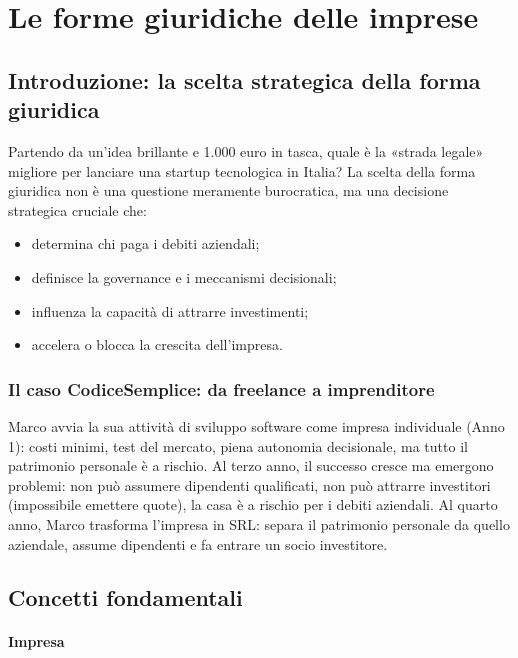 \documentclass[a4paper,12pt]{article}
\begin{document}
	\section{Le forme giuridiche delle imprese}
	
	\subsection{Introduzione: la scelta strategica della forma giuridica}
	
	Partendo da un'idea brillante e 1.000 euro in tasca, quale è la «strada legale» migliore per lanciare una startup tecnologica in Italia?%
	La scelta della forma giuridica non è una questione meramente burocratica, ma una decisione strategica cruciale che:
	\begin{itemize}
		\item determina chi paga i debiti aziendali;
		\item definisce la governance e i meccanismi decisionali;
		\item influenza la capacità di attrarre investimenti;
		\item accelera o blocca la crescita dell'impresa.
	\end{itemize}
	
	\subsubsection{Il caso CodiceSemplice: da freelance a imprenditore}
	
	Marco avvia la sua attività di sviluppo software come impresa individuale (Anno 1): costi minimi, test del mercato, piena autonomia decisionale, ma tutto il patrimonio personale è a rischio.%
	Al terzo anno, il successo cresce ma emergono problemi: non può assumere dipendenti qualificati, non può attrarre investitori (impossibile emettere quote), la casa è a rischio per i debiti aziendali.%
	Al quarto anno, Marco trasforma l'impresa in SRL: separa il patrimonio personale da quello aziendale, assume dipendenti e fa entrare un socio investitore.
	
	\subsection{Concetti fondamentali}
	
	\paragraph{Impresa}
	
\end{document}
